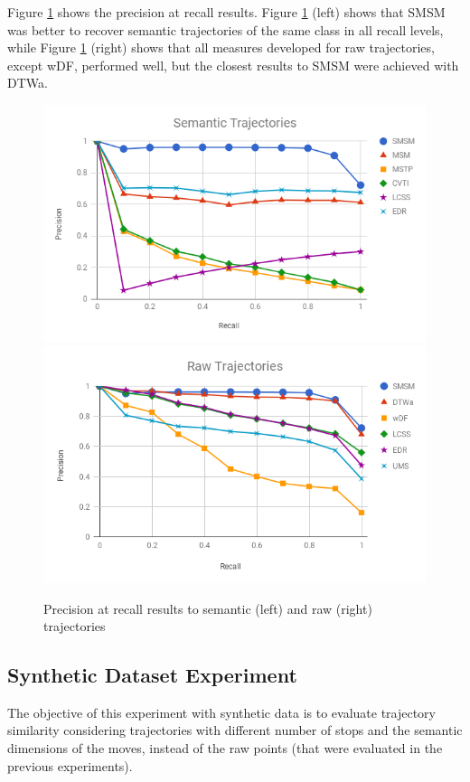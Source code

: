 {Figure {\ref{fig:geolife_precision_recall}} shows the precision at recall results. Figure {\ref{fig:geolife_precision_recall}} (left) shows that SMSM was better to recover semantic trajectories of the same class in all recall levels, while Figure {\ref{fig:geolife_precision_recall}} (right) shows that all measures developed for raw trajectories, except wDF, performed well, but  the closest results to SMSM were achieved with DTWa.}


\begin{figure}[ht!]
\centerline{
\centering
\includegraphics[width=.55\textwidth]{Images/new_P_R-chart_Geolife.png}
\includegraphics[width=.55\textwidth]{Images/new_P_R-chart_Geolife-raw.png}
}
\caption{Precision at recall results to semantic (left) and raw (right) trajectories}
\label{fig:geolife_precision_recall}
\end{figure}

\subsection{Synthetic Dataset Experiment}\label{sec:hermoupolis}
{The objective of this experiment with synthetic data is to evaluate trajectory similarity considering trajectories with different number of stops and the semantic dimensions of the moves, instead of the raw points (that were evaluated in the previous experiments).}

